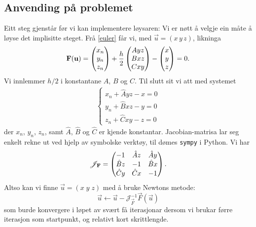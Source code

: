 \documentclass[12pt]{article}
\begin{document}
\begin{multicols*}{2}
    \subsection*{Anvending på problemet}
    Eitt steg gjenstår før vi kan implementere løysaren:
    Vi er nøtt å velgje ein måte å løyse det implisitte steget.
    Frå \eqref{euler} får vi, med $\vec u = (x \, y \, z)$, likninga
    \begin{equation}
        \vec F (\vec u) =
        \begin{pmatrix}
            x_n \\ y_n \\ z_n
        \end{pmatrix}
        + \frac h 2
        \begin{pmatrix}
            A y z \\ B x z \\ C x y
        \end{pmatrix}
        -
        \begin{pmatrix}
            x \\ y \\ z
        \end{pmatrix}
        = 0 \text.
    \end{equation}
    Vi innlemmer $h/2$ i konstantane $A$, $B$ og $C$.
    Til slutt sit vi att med systemet
    \begin{align*}
        \left\{
        \begin{array}{c}
            x_n + \hat A y z - x = 0 \\
            y_n + \hat B x z - y = 0 \\
            z_n + \hat C x y - z = 0
        \end{array}
        \right.
    \end{align*}
    der $x_n$, $y_n$, $z_n$,
    samt $\hat A$, $\hat B$ og $\hat C$ er kjende konstantar.
    Jacobian-matrisa lar seg enkelt rekne ut ved hjelp av symbolske
    verktøy, til dømes {\tt sympy} i Python. Vi har
    \[
        \mathscr J_\vec F = \begin{pmatrix}
            -1          &   \hat A z    & \hat A y \\
            \hat B z    &   -1          & \hat B x \\
            \hat C y    &   \hat C x    & -1
        \end{pmatrix} \text.
    \]
    Altso kan vi finne $\vec u = (x \; y\; z)$ med å bruke Newtons metode:
    \[
        \vec u \longleftarrow \vec u - \mathscr J^{-1}_\vec F \vec F(\vec u)
    \]
    som burde konvergere i løpet av svært få iterasjonar dersom vi brukar
    førre iterasjon som startpunkt, og relativt kort skrittlengde.

    \printbibliography


\end{multicols*}
\end{document}
